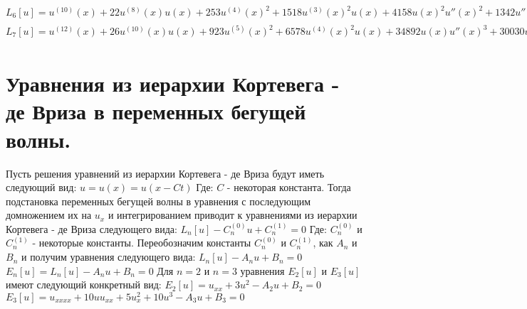 \documentclass[14pt,a4paper]{article}
\begin{document}
\newline
$L_6[u] = u^{(10)}(x)+22 u^{(8)}(x) u(x)+253 u^{(4)}(x)^2+1518 u^{(3)}(x)^2 u(x)+4158 u(x)^2 u''(x)^2+1342u''(x)^3+4620 u(x)^3 u'(x)^2+1155 u'(x)^4+88 u^{(7)}(x) u'(x)+22 u^{(6)}(x) (11 u''(x)+9 u(x)^2)++462 u(x) (22 u'(x)^2+5 u(x)^3)u''(x)+22 u^{(5)}(x)(19 u^{(3)}(x)+54 u(x) u'(x))+66 u^{(4)}(x) (38 u(x) u''(x)+25u'(x)^2+14 u(x)^3)+132u^{(3)}(x) u'(x) (43 u''(x)+42u(x)^2)+462 u(x)^6$
\newline
$L_7[u] = u^{(12)}(x)+26 u^{(10)}(x) u(x)+923 u^{(5)}(x)^2+6578 u^{(4)}(x)^2 u(x)+34892 u(x) u''(x)^3+30030 u(x)^4u'(x)^2+30030u(x) u'(x)^4+130 u^{(9)}(x) u'(x)+26 u^{(8)}(x) (17 u''(x)+11 u(x)^2)+858 u^{(3)}(x)^2(31 u''(x)+23u(x)^2)+12012 u(x)^2 (11 u'(x)^2+u(x)^3) u''(x)+858 (83 u'(x)^2+42 u(x)^3) u''(x)^2+52 u^{(7)}(x)(19 u^{(3)}(x)+44 u(x) u'(x))+3432 u^{(3)}(x) u'(x)(43 u(x) u''(x)+10 u'(x)^2+14 u(x)^3)+26 u^{(6)}(x)(61 u^{(4)}(x)+242 u(x) u''(x)+165 u'(x)^2+66 u(x)^3)+572 u^{(5)}(x) (19 u^{(3)}(x) u(x)+27 u(x)^2 u'(x)+36 u'(x)u''(x))+858 u^{(4)}(x)(38 u(x)^2 u''(x)+25 u''(x)^2+50 u(x) u'(x)^2+36 u^{(3)}(x) u'(x)+7 u(x)^4)+1716 u(x)^7$
\newline
\section{Уравнения из иерархии Кортевега - де Вриза в переменных бегущей волны.}
Пусть решения уравнений из иерархии Кортевега - де Вриза будут иметь следующий вид:
$u = u(x) = u(x - C t)$ \newline
Где: \newline
$C$ - некоторая константа. \newline
Тогда подстановка переменных бегущей волны в уравнения с последующим домножением их на $u_x$ и интегрированием приводит к уравнениями из иерархии Кортевега - де Вриза следующего вида: \newline
$L_{n} [u] - C_{n}^{(0)} u + C_{n}^{(1)} = 0$ \newline
Где:
$C_{n}^{(0)}$ и $C_{n}^{(1)}$ - некоторые константы. \newline
Переобозначим константы $C_{n}^{(0)}$ и $C_{n}^{(1)}$, как $A_n$ и $B_n$ и получим уравнения следующего вида: \newline
$L_{n} [u] - A_{n} u + B_{n} = 0$
\newline
$E_{n} [u] = L_{n} [u] - A_{n} u + B_{n} = 0$
\newline
Для $n = 2$ и $n = 3$ уравнения $E_2 [u]$ и $E_3[u]$ имеют следующий конкретный вид: \newline
$E_{2} [u] = u_{xx} + 3 u^2 - A_{2} u + B_{2} = 0$
\newline
$E_{3} [u] = u_{xxxx} + 10uu_{xx} + 5 u_{x}^{2} + 10 u^3 - A_{3} u + B_{3} = 0$
\newline
\end{document}
